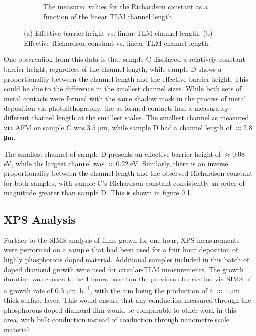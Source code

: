 \begin{figure}[htbp]
\begin{subfigure}[b]{0.49\textwidth}
        \caption{The measured values for the Richardson constant as a function of the linear TLM channel length.}
        \label{fig:richardson}
    \end{subfigure}
    \caption{(a) Effective barrier height vs. linear TLM channel length. (b) Effective Richardson constant vs. linear TLM channel length.}
    \label{fig:side_by_side_barrier_richardson}
\end{figure}

 One observation from this data is that sample C displayed a relatively constant barrier height, regardless of the channel length, while sample D shows a proportionality between the channel length and the effective barrier height. This could be due to the difference in the smallest channel sizes. While both sets of metal contacts were formed with the same shadow mask in the process of metal deposition via photolithography, the as formed contacts had a measurably different channel length at the smallest scales. The smallest channel as measured via AFM on sample C was $3.5$ \si{\micro\metre}, while sample D had a channel length of $\approx2.8$ \si{\micro\metre}. 
 
 The smallest channel of sample D presents an effective barrier height of $\approx0.08$ \si{\electronvolt}, while the largest channel was $\approx0.22$ \si{\electronvolt}. Similarly, there is an inverse proportionality between the channel length and the observed Richardson constant for both samples, with sample C's Richardson constant consistently an order of magnitude greater than sample D. This is shown in figure \ref{}


\subsection{XPS Analysis}

Further to the SIMS analysis of films grown for one hour, XPS measurements were performed on a sample that had been used for a four hour deposition of highly phosphorous doped material. Additional samples included in this batch of doped diamond growth were used for circular-TLM measurements. The growth duration was chosen to be 4 hours based on the previous observation via SIMS of a growth rate of 0.3 \si{\micro\metre\per\hour}, with the aim being the production of a $\approx1$ \si{\micro\metre} thick surface layer. This would ensure that any conduction measured through the phosphorous doped diamond film would be comparable to other work in this area, with bulk conduction instead of conduction through nanometre scale material.

